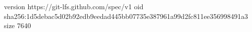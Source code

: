 version https://git-lfs.github.com/spec/v1
oid sha256:1d5debac5d02b92edb9eedad445bb07735e387961a99d2fc811ee356998491a3
size 7640
